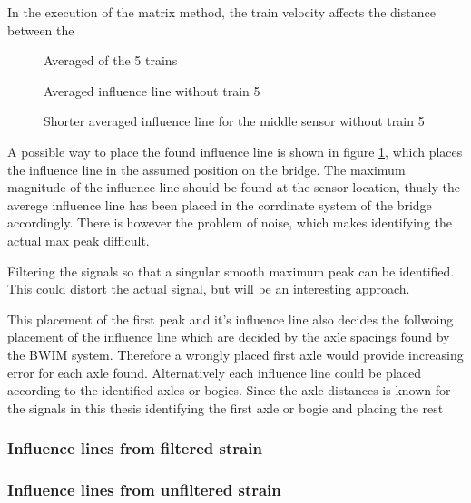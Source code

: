 In the execution of the matrix method, the train velocity affects the distance between the
\begin{figure}[H]
	\centering
	
	\caption{Averaged of the 5 trains}
	\label{fig:infl_vec_averaged_wBridge}
\end{figure}

\begin{figure}[H]
	\centering
	
	\caption{Averaged influence line without train 5}
	\label{fig:infl_vec_averaged_wo_train5}
\end{figure}

\begin{figure}[H]
	\centering
	
	\caption{Shorter averaged influence line for the middle sensor without train 5}
	\label{fig:infl_vec_averaged_fft10hz}
\end{figure}

A possible way to place the found influence line is shown in figure \ref{fig:infl_vec_averaged_wBridge}, which places the influence line in the assumed position on the bridge. The maximum magnitude of the influence line should be found at the sensor location, thusly the averege influence line has been placed in the corrdinate system of the bridge accordingly. There is however the problem of noise, which makes identifying the actual max peak difficult.

Filtering the signals so that a singular smooth maximum peak can be identified. This could distort the actual signal, but will be an interesting approach.

This placement of the first peak and it's influence line also decides the follwoing placement of the influence line which are decided by the axle spacings found by the BWIM system. Therefore a wrongly placed first axle would provide increasing error for each axle found.
Alternatively each influence line could be placed according to the identified axles or bogies. Since the axle distances is known for the signals in this thesis identifying the first axle or bogie and placing the rest
\subsubsection{Influence lines from filtered strain}

\subsubsection{Influence lines from unfiltered strain}
